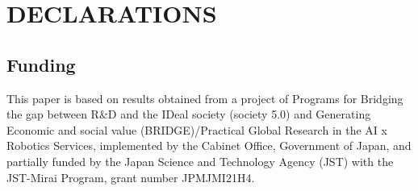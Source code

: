 \documentclass{IJCAS}
\begin{document}
\section*{DECLARATIONS}
\subsection*{Funding }
This paper is based on results obtained from a project of Programs for Bridging the gap between R\&D and the IDeal society (society 5.0) and Generating Economic and social value (BRIDGE)/Practical Global Research in the AI x Robotics Services, implemented by the Cabinet Office, Government of Japan, and partially funded by the Japan Science and Technology Agency (JST) with the JST-Mirai Program, grant number JPMJMI21H4.


% 
% 






\end{document}
